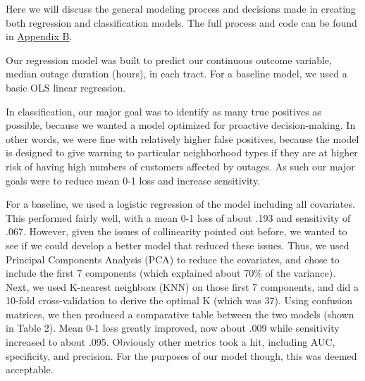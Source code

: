 \documentclass[
]{article}
\begin{document}
Here we will discuss the general modeling process and decisions made in
creating both regression and classification models. The full process and
code can be found in \protect\hyperlink{appendixB}{Appendix B}.

Our regression model was built to predict our continuous outcome
variable, median outage duration (hours), in each tract. For a baseline
model, we used a basic OLS linear regression.

\begin{table}

\caption{\label{tab:unnamed-chunk-4}Prediction Error, R^2, and CVerror for Regression Models}
\centering
{}
\end{table}

In classification, our major goal was to identify as many true positives
as possible, because we wanted a model optimized for proactive
decision-making. In other words, we were fine with relatively higher
false positives, because the model is designed to give warning to
particular neighborhood types if they are at higher risk of having high
numbers of customers affected by outages. As such our major goals were
to reduce mean 0-1 loss and increase sensitivity.

For a baseline, we used a logistic regression of the model including all
covariates. This performed fairly well, with a mean 0-1 loss of about
.193 and sensitivity of .067. However, given the issues of collinearity
pointed out before, we wanted to see if we could develop a better model
that reduced these issues. Thus, we used Principal Components Analysis
(PCA) to reduce the covariates, and chose to include the first 7
components (which explained about 70\% of the variance). Next, we used
K-nearest neighbors (KNN) on those first 7 components, and did a 10-fold
cross-validation to derive the optimal K (which was 37). Using confusion
matrices, we then produced a comparative table between the two models
(shown in Table 2). Mean 0-1 loss greatly improved, now about .009 while
sensitivity increased to about .095. Obviously other metrics took a hit,
including AUC, specificity, and precision. For the purposes of our model
though, this was deemed acceptable.
\end{document}
